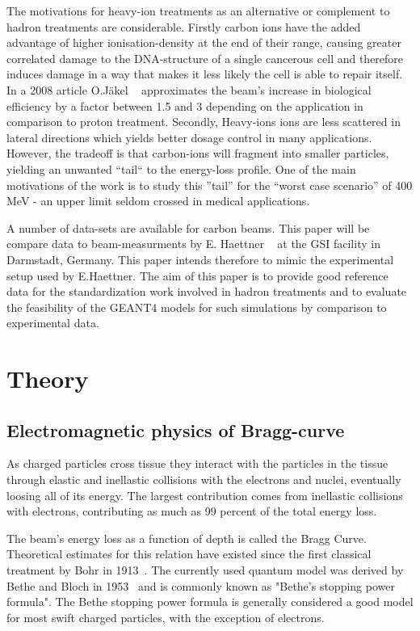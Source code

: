 The motivations for heavy-ion treatments as an alternative or complement to hadron treatments are considerable. Firstly carbon ions have the added advantage of higher ionisation-density at the end of their range, causing greater correlated damage to the DNA-structure of a single cancerous cell and therefore induces damage in a way that makes it less likely the cell is able to repair itself. In a 2008 article O.Jäkel ~\cite{ojakel} approximates the beam's increase in biological efficiency by a factor between 1.5 and 3 depending on the application in comparison to proton treatment. Secondly, Heavy-ions ions are less scattered in lateral directions which yields better dosage control in many applications. However, the tradeoff is that carbon-ions will fragment into smaller particles, yielding an unwanted ``tail`` to the energy-loss profile. One of the main motivations of the work is to study this ''tail'' for the ``worst case scenario'' of 400 MeV - an upper limit seldom crossed in medical applications.

A number of data-sets are available for carbon beams. This paper will be compare data to beam-measurments by E. Haettner ~\cite{ehaettner}  at the GSI facility in Darmstadt, Germany. This paper intends therefore to mimic the experimental setup used by E.Haettner. The aim of this paper is  to provide good reference data for the standardization work involved in hadron treatments and to evaluate the feasibility of the GEANT4 models for such simulations by comparison to experimental data.

\section{Theory}

\subsection{Electromagnetic physics of Bragg-curve}
As charged particles cross tissue they interact with the particles in the tissue through elastic and inellastic collisions with the electrons and nuclei, eventually loosing all of its energy. The largest contribution comes from inellastic collisions with electrons, contributing as much as 99 percent of the total energy loss.

The beam's energy loss as a function of depth is called the Bragg Curve. Theoretical estimates for this relation have existed since the first classical treatment by Bohr in 1913~\cite{bohr13}. The currently used quantum model was derived by Bethe and Bloch in 1953~\cite{bethebloch53}  and is commonly known as "Bethe's stopping power formula". The Bethe stopping power formula is generally considered a good model for most swift charged particles, with the exception of electrons.

